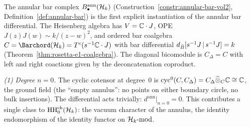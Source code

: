 \begin{computation}%
\label{comp:heisenberg-annular-bar}%
%
%
%
The annular bar complex
$B^{\mathrm{ann}}_\bullet(\mathcal{H}_k)$
(Construction~\ref{constr:annular-bar-vol2},
Definition~\ref{def:annular-bar}) is the first
explicit instantiation of the annular bar differential.
The Heisenberg algebra has $V = \mathbb{C} \cdot J$,
OPE $J(z)J(w) \sim k/(z-w)^2$, and
ordered bar coalgebra $C = \Barchord(\cH_k) = T^c(s^{-1}\bC\cdot J)$
with bar differential
$d_{\bar{B}}[s^{-1}J\,|\,s^{-1}J] = k$
(Theorem~\ref{thm:rosetta-e1-coalgebra}).
The diagonal bicomodule is $C_\Delta = C$ with left and
right coactions given by the deconcatenation coproduct.

\smallskip
\noindent
\emph{(1) Degree $n=0$.}
The cyclic cotensor at degree~$0$ is
$\mathrm{cyc}^0(C,C_\Delta) = C_\Delta \widehat\otimes_C \mathbb{C}
\cong \mathbb{C}$,
the ground field (the ``empty annulus'':
no points on either boundary circle, no bulk insertions).
The differential acts trivially: $d^{\mathrm{ann}}|_{n=0} = 0$.
This contributes a single class to
$\operatorname{HH}^{\mathrm{ch}}_0(\mathcal{H}_k)$: the vacuum
character of the annulus, the identity endomorphism of the
identity functor on $\mathcal{H}_k\text{-mod}$.


\end{computation}
